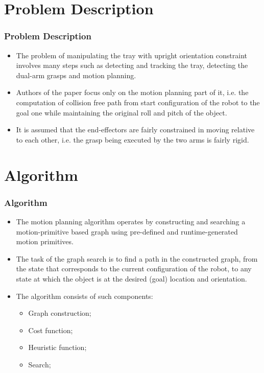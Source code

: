 \documentclass{beamer}
\begin{document}
\section{Problem Description}
\begin{frame}
\frametitle{Problem Description}
\begin{itemize}
  \item The problem of manipulating the tray with upright orientation constraint
  involves many steps such as detecting and tracking the tray, detecting the dual-arm grasps and motion planning.
  \item Authors of the paper focus only on the motion planning part of it, i.e.
  the computation of collision free path from start configuration of the robot to the goal one while maintaining the original roll and pitch of the object. 
  \item It is assumed that the end-effectors are fairly constrained in moving
  relative to each other, i.e. the grasp being executed by the two arms is fairly rigid.
\end{itemize}
\end{frame}

\section{Algorithm}
\begin{frame}
\frametitle{Algorithm}
\begin{itemize}
  \item The motion planning algorithm operates by constructing and searching a motion-primitive based graph using pre-defined and runtime-generated motion primitives.
  \item The task of the graph search is to find a path in the constructed graph, from the state that corresponds to the current configuration of the robot, to any state at which the object is at the desired (goal) location and orientation.
  \item The algorithm consists of such components:
  \begin{itemize}
	\item Graph construction;
	\item Cost function;
	\item Heuristic function;
	\item Search;
  \end{itemize}
\end{itemize}
\end{frame}
\end{document}
